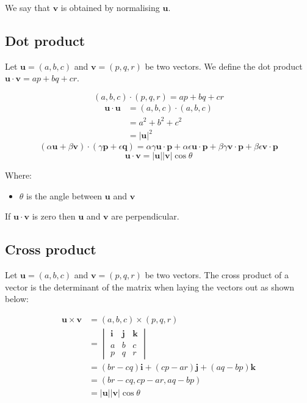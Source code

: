 \documentclass[11pt]{article}
\begin{document}
We say that \(\boldsymbol{v}\) is obtained by normalising \(\boldsymbol{u}\).

\subsection{Dot product}
\label{sec:orgc0a6617}
Let \(\boldsymbol{u} = (a, b, c)\) and \(\boldsymbol{v} = (p, q, r)\) be two vectors. We define the dot product \(\boldsymbol{u} \cdot \boldsymbol{v} = ap + bq + cr\).

\[(a, b, c) \cdot (p, q, r) = ap + bq + cr\]
\begin{align*}
\boldsymbol{u} \cdot \boldsymbol{u} &= (a, b, c) \cdot (a, b, c) \\
&= a^2 + b^2 + c^2 \\
&= | \boldsymbol{u} |^2
\end{align*}
\[(\alpha \boldsymbol{u} + \beta \boldsymbol{v}) \cdot (\gamma \boldsymbol{p} + \epsilon \boldsymbol{q}) = \alpha \gamma \boldsymbol{u} \cdot \boldsymbol{p} + \alpha \epsilon \boldsymbol{u} \cdot \boldsymbol{p} + \beta \gamma \boldsymbol{v} \cdot \boldsymbol{p} + \beta \epsilon \boldsymbol{v} \cdot \boldsymbol{p}\]
\[\boldsymbol{u} \cdot \boldsymbol{v} = | \boldsymbol{u} | | \boldsymbol{v} | \cos \theta\]

Where:
\begin{itemize}
\item \(\theta\) is the angle between \(\boldsymbol{u}\) and \(\boldsymbol{v}\)
\end{itemize}

If \(\boldsymbol{u} \cdot \boldsymbol{v}\) is zero then \(\boldsymbol{u}\) and \(\boldsymbol{v}\) are perpendicular.

 \newpage

\subsection{Cross product}
\label{sec:org12fc31b}
Let \(\boldsymbol{u} = (a, b, c)\) and \(\boldsymbol{v} = (p, q, r)\) be two vectors. The cross product of a vector is the determinant of the matrix when laying the vectors out as shown below:

\begin{align*}
\boldsymbol{u} \times \boldsymbol{v}
&= (a, b, c) \times (p, q, r) \\
&= \begin{vmatrix}
\boldsymbol{i} & \boldsymbol{j} & \boldsymbol{k} \\
a & b & c \\
p & q & r
\end{vmatrix} \\
&= (br - cq) \boldsymbol{i} + (cp - ar) \boldsymbol{j} + (aq - bp) \boldsymbol{k} \\
&= (br - cq, cp - ar, aq - bp) \\
&= |\boldsymbol{u}| |\boldsymbol{v}| \cos \theta
\end{align*}
\end{document}
